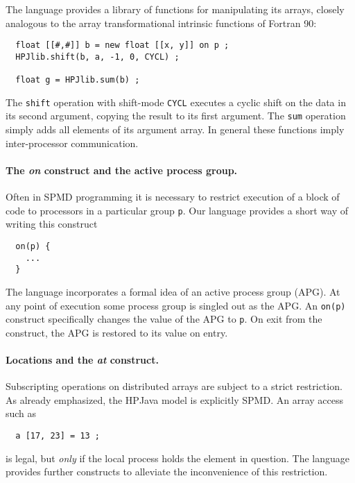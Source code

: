 The language provides a library of functions for manipulating its
arrays, closely analogous to the array transformational intrinsic
functions of Fortran 90:
\small
\begin{verbatim}
  float [[#,#]] b = new float [[x, y]] on p ;
  HPJlib.shift(b, a, -1, 0, CYCL) ;

  float g = HPJlib.sum(b) ;
\end{verbatim}
\normalsize
The {\tt shift} operation with shift-mode {\tt CYCL} executes a cyclic
shift on the data in its second argument, copying the result to its
first argument.  The {\tt sum} operation simply adds all elements of
its argument array.
In general these functions imply inter-processor communication.

\paragraph{The {\em on} construct and the active process group.}

Often in SPMD programming it is necessary to restrict execution
of a block of code to processors in a particular group {\tt p}.
Our language provides a short way of writing this construct
\small
\begin{verbatim}
  on(p) {
    ...
  }
\end{verbatim}
\normalsize
The language incorporates a formal idea of an active process group
(APG).  At any point of execution some process group is singled out as
the APG.  An {\tt on(p)} construct specifically changes the value of
the APG to {\tt p}.  On exit from the construct, the APG is restored to
its value on entry.

\paragraph{Locations and the {\em at} construct.}

Subscripting operations on distributed arrays are subject to a strict
restriction.  As already emphasized, the HPJava model is explicitly SPMD.
An array access such as
\small
\begin{verbatim}
  a [17, 23] = 13 ;
\end{verbatim}
\normalsize
is legal, but {\em only} if the local process holds the element in
question.  The language provides further
constructs to alleviate the inconvenience of this restriction.

